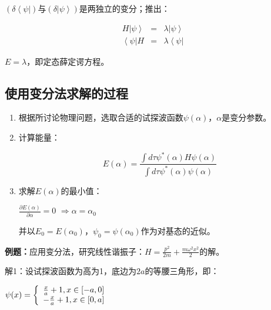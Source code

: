 $\left( {\delta \left\langle \psi  \right|} \right)$与$\left( {\delta \left| \psi  \right\rangle } \right)$是两独立的变分；推出：

\begin{eqnarray*}
H\left| \psi  \right\rangle &  = & \lambda \left| \psi  \right\rangle  \\
 \left\langle \psi  \right|H & = & \lambda \left\langle \psi  \right| 
\end{eqnarray*}

$E = \lambda $，即定态薛定谔方程。


\subsection{使用变分法求解的过程}




\begin{enumerate}
    \item 根据所讨论物理问题，选取合适的试探波函数$\psi \left( \alpha  \right)$，$\alpha$是变分参数。
    \item 计算能量：

\begin{equation}\label{23-4}
E\left( \alpha  \right) = \frac{{\int {d\tau \psi ^* (\alpha )H\psi (\alpha )} }}{{\int {d\tau \psi ^* (\alpha )\psi (\alpha )} }}
\end{equation}

    \item 求解$E(\alpha )$的最小值：

$\frac{{\partial E(\alpha )}}{{\partial \alpha }} = 0$
$ \Rightarrow \alpha  = \alpha _0 $


并以$E_0  = E(\alpha _0 )$，$\psi _0  = \psi (\alpha _0 )$作为对基态的近似。
   \end{enumerate}

\textbf{例题：}应用变分法，研究线性谐振子：$H = \frac{{p^2 }}{{2m}} + \frac{{m\omega ^2 x^2 }}{2}$的解。

解1：设试探波函数为高为1，底边为$2a$的等腰三角形，即：


\begin{center}
$\psi (x) = \left\{ \begin{array}{l}
 {\textstyle{x \over a}} + 1,x \in \left[ { - a,0} \right] \\
  - {\textstyle{x \over a}} + 1,x \in \left[ {0,a} \right] \\
 \end{array} \right.$
\end{center}


